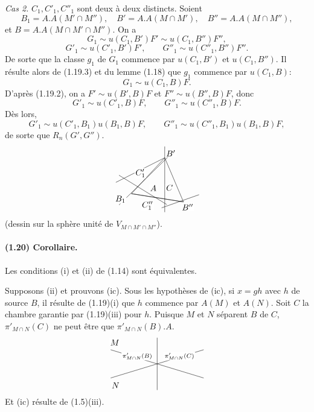 \documentclass[10pt]{article}
\begin{document}
\emph{Cas 2.} $C_1,C'_1,C''_1$ sont deux à deux distincts. Soient
\[
B_1=A.A(M'\cap M''),\quad B'=A.A(M\cap M'),\quad
B''=A.A(M\cap M''),
\]
et $B=A.A(M\cap M'\cap M'')$. On a
\[
G_1\sim u(C_1,B')F'\sim u(C_1,B'')F'',
\]
\[
G'_1\sim u(C'_1,B')F',\qquad
G''_1\sim u(C''_1,B'')F''.
\]
De sorte que la classe $g_1$ de $G_1$ commence par $u(C_1,B')$ et $u(C_1,B'')$. Il résulte alors de (1.19.3) et du lemme (1.18) que $g_1$ commence par $u(C_1,B)$:
\[
G_1\sim u(C_1,B)F.
\]
D'après (1.19.2), on a $F'\sim u(B',B)F$ et $F''\sim u(B'',B)F$, donc
\[
G'_1\sim u(C'_1,B)F,
\qquad
G''_1\sim u(C''_1,B)F.
\]
Dès lors,
\[
G'_1\sim u(C'_1,B_1)u(B_1,B)F,
\qquad
G''_1\sim u(C''_1,B_1)u(B_1,B)F,
\]
de sorte que $R_n(G',G'')$.
\[
\begin{tikzpicture}[scale=0.86,baseline={(0,0)}]
\coordinate (L) at (-1.25,-0.65);
\coordinate (T) at (0.35,1.10);
\coordinate (R) at (1.25,-1.05);
\draw (L)--(T)--(R)--cycle;
\draw (L)--(R);
\draw (0.35,1.65)--(0.35,-1.55);
\draw (-1.85,-1.20)--(0.85,1.48);
\draw (-2.0,-0.10)--(0.35,1.10);
\draw (-1.85,0.25)--(0.45,-1.18);
\draw (0.20,-1.34)--(2.00,-0.70);
\node[fill=white,inner sep=1pt] at (-1.78,-0.92) {$B_1$};
\node[fill=white,inner sep=1pt] at (-0.82,0.35) {$C'_1$};
\node[fill=white,inner sep=1pt] at (-0.48,-1.22) {$C''_1$};
\node[fill=white,inner sep=1pt] at (-0.20,-0.38) {$A$};
\node[fill=white,inner sep=1pt] at (0.58,-0.36) {$C$};
\node[fill=white,inner sep=1pt] at (0.64,1.32) {$B'$};
\node[fill=white,inner sep=1pt] at (1.45,-1.30) {$B''$};
\end{tikzpicture}
\]
(dessin sur la sphère unité de $V_{M\cap M'\cap M''}$).

\paragraph{(1.20) Corollaire.} Les conditions (i) et (ii) de (1.14) sont équivalentes.

Supposons (ii) et prouvons (ic). Sous les hypothèses de (ic), si $x=gh$ avec $h$ de source $B$, il résulte de (1.19)(i) que $h$ commence par $A(M)$ et $A(N)$. Soit $C$ la chambre garantie par (1.19)(iii) pour $h$. Puisque $M$ et $N$ séparent $B$ de $C$, $\pi'_{M\cap N}(C)$ ne peut être que $\pi'_{M\cap N}(B).A$.
\[
\begin{tikzpicture}[scale=0.95,baseline={(0,0)}]
\draw (-2.05,0.62)--(2.05,-0.62);
\draw (-2.05,-0.62)--(2.05,0.62);
\draw (0,-1.15)--(0,1.15);
\node[fill=white,inner sep=1pt,above left] at (-1.62,0.77) {$M$};
\node[fill=white,inner sep=1pt,below left] at (-1.62,-0.77) {$N$};
\node[fill=white,inner sep=1pt,above] at (-0.88,0.15) {$\scriptstyle\pi'_{M\cap N}(B)$};
\node[fill=white,inner sep=1pt,above] at (0.98,0.15) {$\scriptstyle\pi'_{M\cap N}(C)$};
\end{tikzpicture}
\]
Et (ic) résulte de (1.5)(iii).
\end{document}
